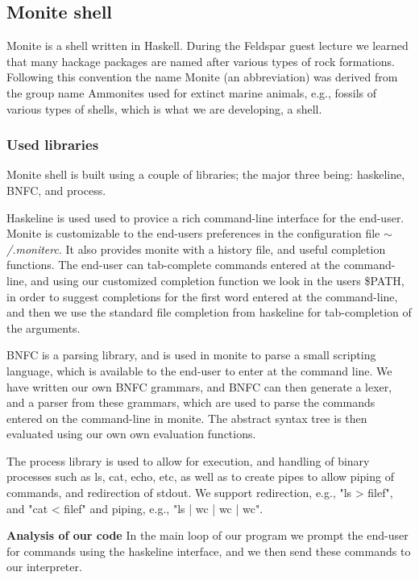 \documentclass[11pt,a4paper]{article}
\begin{document}
\subsection{Monite shell}
\label{monite}

Monite is a shell written in Haskell. During the Feldspar guest lecture we
learned that many hackage packages are named after various types of rock
formations. Following this convention the name Monite (an abbreviation) was
derived from the group name Ammonites used for extinct marine animals, e.g.,
fossils of various types of shells, which is what we are developing, a shell.

\subsubsection{Used libraries}

Monite shell is built using a couple
of libraries; the major three being: haskeline, BNFC, and process.

Haskeline is used used to provice a rich command-line interface for the
end-user. Monite is customizable to the end-users preferences in the
configuration file $\mathtt{\sim}$\textit{/.moniterc}. It also provides monite
with a history file, and useful completion functions. The end-user can
tab-complete commands entered at the command-line, and using our customized
completion function we look in the users \$PATH, in order to suggest completions
for the first word entered at the command-line, and then we use the standard
file completion from haskeline for tab-completion of the arguments.

BNFC is a parsing library, and is used in monite to parse a small scripting
language, which is available to the end-user to enter at the command line. We
have written our own BNFC grammars, and BNFC can then generate a lexer, and a
parser from these grammars, which are used to parse the commands entered on the
command-line in monite. The abstract syntax tree is then evaluated using our own
own evaluation functions.

The process library is used to allow for execution, and handling of binary
processes such as ls, cat, echo, etc, as well as to create pipes to allow
piping of commands, and redirection of stdout. We support redirection, e.g.,
"ls > filef", and "cat < filef" and piping, e.g., "ls | wc | wc | wc".

\textbf{Analysis of our code}
In the main loop of our program we prompt the end-user for commands using the
haskeline interface, and we then send these commands to our interpreter.
\end{document}
